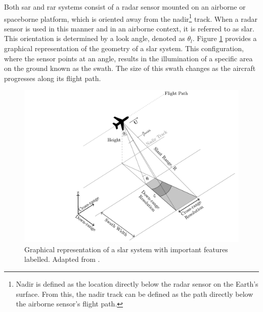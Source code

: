 Both \acs{sar} and \ac{rar} systems consist of a radar sensor mounted on an airborne or spaceborne platform, which is oriented away from the nadir\footnote{Nadir is defined as the location directly below the radar sensor on the Earth's surface. From this, the nadir track can be defined as the path directly below the airborne sensor's flight path.} track. When a radar sensor is used in this manner and in an airborne context, it is referred to as \ac{slar}.  This orientation is determined by a look angle, denoted as $\theta_{l}$. Figure \ref{fig:theory.slarGeometry} provides a graphical representation of the geometry of a \acs{slar} system. This configuration, where the sensor points at an angle, results in the illumination of a specific area on the ground known as the swath. The size of this swath changes as the aircraft progresses along its flight path.

\begin{figure}[htbp]
    \centering
    \includegraphics[width=.95\linewidth]{Figures/Theory/slarGeometry.pdf}
    \caption{Graphical representation of a \acs{slar} system with important features labelled. Adapted from \cite{Moreira2013,Meyer2019}.}
    \label{fig:theory.slarGeometry}
\end{figure}

